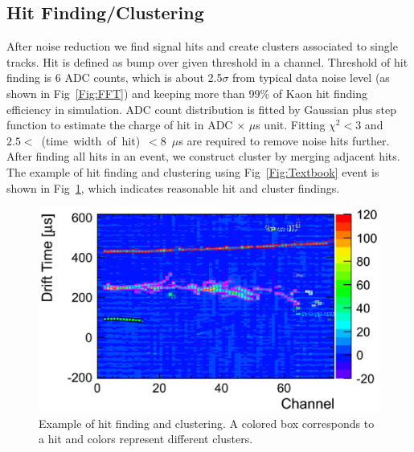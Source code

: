 \subsection{Hit Finding/Clustering}
After noise reduction we find signal hits and create clusters associated to single tracks. 
Hit is defined as bump over given threshold in a channel. 
Threshold of hit finding is 6 ADC counts, which is about 2.5$\sigma$ from typical data noise 
level (as shown in Fig~\ref{Fig:FFT}) and keeping more than 99\% of Kaon hit finding efficiency in simulation.
ADC count distribution is fitted by Gaussian plus step function to estimate the charge of hit in ADC $\times$ $\mu$s unit.
Fitting $\chi^2 < 3$ and $2.5<$~(time~width~of~hit)~$<8$~$\mu$s are required to remove noise hits further.
After finding all hits in an event, we construct cluster by merging adjacent hits. 
The example of hit finding and clustering using Fig~\ref{Fig:Textbook} event is shown in Fig~\ref{fig:Clustering}, which indicates reasonable hit and cluster findings. 

\begin{figure}[htbp]
 \begin{center}
  \includegraphics[width=1.0\hsize]{fig/clustering.eps}
 \end{center}
 \caption{Example of hit finding and clustering. A colored box corresponds to a hit and colors represent different clusters.}
 \label{fig:Clustering}
\end{figure}


